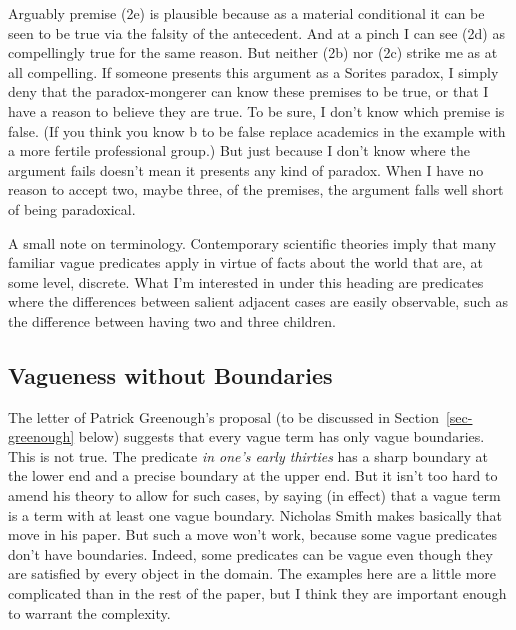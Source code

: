 \documentclass[
  11pt,
  letterpaper,
  DIV=11,
  numbers=noendperiod,
  twoside]{scrartcl}
\begin{document}
Arguably premise (2e) is plausible because as a material conditional it
can be seen to be true via the falsity of the antecedent. And at a pinch
I can see (2d) as compellingly true for the same reason. But neither
(2b) nor (2c) strike me as at all compelling. If someone presents this
argument as a Sorites paradox, I simply deny that the paradox-mongerer
can know these premises to be true, or that I have a reason to believe
they are true. To be sure, I don't know which premise is false. (If you
think you know b to be false replace academics in the example with a
more fertile professional group.) But just because I don't know where
the argument fails doesn't mean it presents any kind of paradox. When I
have no reason to accept two, maybe three, of the premises, the argument
falls well short of being paradoxical.

A small note on terminology. Contemporary scientific theories imply that
many familiar vague predicates apply in virtue of facts about the world
that are, at some level, discrete. What I'm interested in under this
heading are predicates where the differences between salient adjacent
cases are easily observable, such as the difference between having two
and three children.

\subsection{Vagueness without
Boundaries}\label{vagueness-without-boundaries}

The letter of Patrick Greenough's proposal (to be discussed in
Section~\ref{sec-greenough} below) suggests that every vague term has
only vague boundaries. This is not true. The predicate \emph{in one's
early thirties} has a sharp boundary at the lower end and a precise
boundary at the upper end. But it isn't too hard to amend his theory to
allow for such cases, by saying (in effect) that a vague term is a term
with at least one vague boundary. Nicholas Smith makes basically that
move in his paper. But such a move won't work, because some vague
predicates don't have boundaries. Indeed, some predicates can be vague
even though they are satisfied by every object in the domain. The
examples here are a little more complicated than in the rest of the
paper, but I think they are important enough to warrant the complexity.
\end{document}
